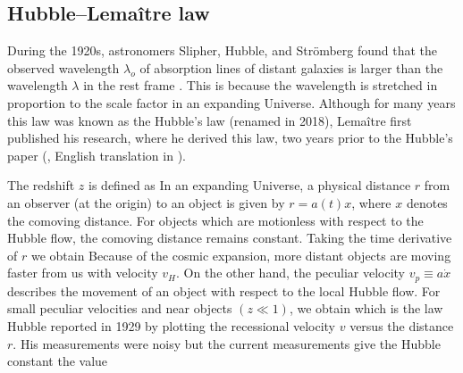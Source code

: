 \subsection{Hubble--Lema\^{i}tre law}
During the 1920s, astronomers Slipher, Hubble, and Str{\"o}mberg found that the observed wavelength $\lambda_o$ of absorption lines of distant galaxies is larger than the wavelength $\lambda$ in the rest frame \parencite{1925ApJ....61..353S,1929PNAS...15..168H}. This is because the wavelength is stretched in proportion to the scale factor in an expanding Universe. Although for many years this law was known as the Hubble's law (renamed in 2018), Lema\^{i}tre first published his research, where he derived this law, two years prior to the Hubble's paper (\textcite{1927ASSB...47...49L}, English translation in \textcite{1931MNRAS..91..483L}).

The redshift $z$ is defined as
In an expanding Universe, a physical distance $r$ from an observer (at the origin) to an object is given by $r=a(t)x$, where $x$ denotes the comoving distance. For objects which are motionless with respect to the Hubble flow, the comoving distance remains constant. Taking the time derivative of $r$ we obtain
Because of the cosmic expansion, more distant objects are moving faster from us with velocity $v_H$. On the other hand, the peculiar velocity $v_p\equiv a\dot x$ describes the movement of an object with respect to the local Hubble flow. For small peculiar velocities and near objects $(z\ll1)$, we obtain
which is the law Hubble reported in 1929 by plotting the recessional velocity $v$ versus the distance $r$. His measurements were noisy but the current measurements give the Hubble constant the value \parencite{planck_cosm}

